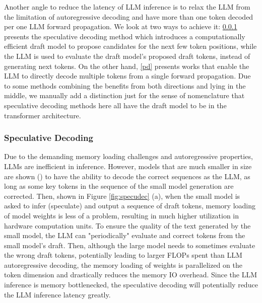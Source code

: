 Another angle to reduce the latency of LLM inference is to relax the LLM from the limitation of autoregressive decoding and have more than one token decoded per one LLM forward propagation. We look at two ways to achieve it: \ref{specdec} presents the speculative decoding method which introduces a computationally efficient draft model to propose candidates for the next few token positions, while the LLM is used to evaluate the draft model's proposed draft tokens, instead of generating next tokens. 
On the other hand, \ref{pd} presents works that enable the LLM to directly decode multiple tokens from a single forward propagation. Due to some methods combining the benefits from both directions and lying in the middle, we manually add a distinction just for the sense of nomenclature that speculative decoding methods here all have the draft model to be in the transformer architecture. 

\subsubsection{Speculative Decoding} \label{specdec} 

Due to the demanding memory loading challenges and autoregressive properties, LLMs are inefficient in inference. However, models that are much smaller in size are shown (\cite{kim2023speculative}) to have the ability to decode the correct sequences as the LLM, as long as some key tokens in the sequence of the small model generation are corrected. Then, shown in Figure \ref{fig:specudec} (a), when the small model is asked to infer (speculate) and output a sequence of draft tokens, memory loading of model weights is less of a problem, resulting in much higher utilization in hardware computation units. To ensure the quality of the text generated by the small model, the LLM can "periodically" evaluate and correct tokens from the small model's draft. Then, although the large model needs to sometimes evaluate the wrong draft tokens, potentially leading to larger FLOPs spent than LLM autoregressive decoding, the memory loading of weights is parallelized on the token dimension and drastically reduces the memory IO overhead. Since the LLM inference is memory bottlenecked, the speculative decoding will potentially reduce the LLM inference latency greatly. 

